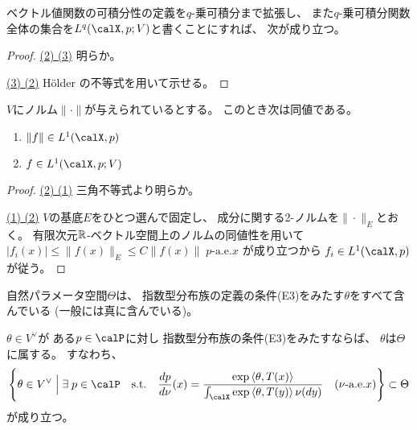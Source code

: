 \documentclass[report]{jlreq}
\begin{document}
ベクトル値関数の可積分性の定義を$q$-乗可積分まで拡張し、
また$q$-乗可積分関数全体の集合を$L^q(\calX, p; V)$と書くことにすれば、
次が成り立つ。


\begin{proof}
    \uline{(2) \Rightarrow (3)} \quad 明らか。

    \uline{(3) \Rightarrow (2)} \quad
    H\"older の不等式を用いて示せる。
\end{proof}

\begin{proposition}
    $V$にノルム$\| \cdot \|$が与えられているとする。
    このとき次は同値である。
    \begin{enumerate}
        \item $\| f \| \in L^1(\calX, p)$
        \item $f \in L^1(\calX, p; V)$
    \end{enumerate}
\end{proposition}

\begin{proof}
    \uline{(2) \Rightarrow (1)} \quad
    三角不等式より明らか。

    \uline{(1) \Rightarrow (2)} \quad
    $V$の基底$E$をひとつ選んで固定し、
    成分に関する2-ノルムを$\| \cdot \|_E$とおく。
    有限次元$\mathbb{R}$-ベクトル空間上のノルムの同値性を用いて
    $|f_i(x)| \le \| f(x) \|_E \le C\| f(x) \| \; \text{$p$-a.e.$x$}$
    が成り立つから
    $f_i \in L^1(\calX, p)$が従う。
\end{proof}

自然パラメータ空間$\Theta$は、
指数型分布族の定義の条件(E3)をみたす$\theta$をすべて含んでいる
(一般には真に含んでいる)。

\begin{proposition}
    $\theta \in V^\vee$が
    ある$p \in \calP$に対し
    指数型分布族の条件(E3)をみたすならば、
    $\theta$は$\Theta$に属する。
    すなわち、
    \begin{equation}
        \mybrace{
            \theta \in V^\vee
            \;\Big|\;
            \exists \; p \in \calP
            \quad \text{s.t.} \quad
            \dd[p]{\nu}(x)
                = \frac{
                    \exp{\langle \theta, T(x) \rangle}
                }{
                    \int_\calX \exp{\langle \theta, T(y) \rangle} \, \nu(dy)
                }
                \quad
                (\text{$\nu$-a.e.$x$})
        }
            \subset \Theta
    \end{equation}
    が成り立つ。
\end{proposition}
\end{document}
